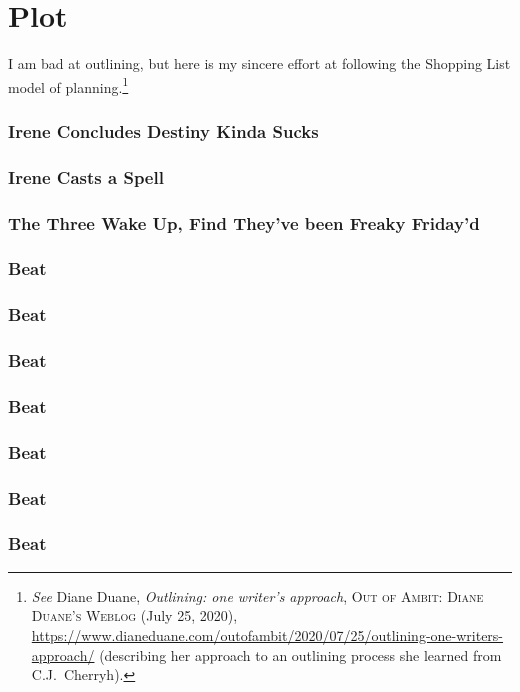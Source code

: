 \documentclass[../FGP.tex]{subfiles}
\begin{document}
\setmarginpargeometry
\part{Plot}
I am bad at outlining, but here is my sincere effort at following the Shopping List model of planning.\footnote{\textit{See} Diane Duane, \textit{Outlining: one writer’s approach}, \textsc{Out of Ambit: Diane Duane's Weblog} (July 25, 2020), \url{https://www.dianeduane.com/outofambit/2020/07/25/outlining-one-writers-approach/} (describing her approach to an outlining process she learned from C.J.~Cherryh).}
\section{Irene Concludes Destiny Kinda Sucks}
\section{Irene Casts a Spell}
\section{The Three Wake Up, Find They've been Freaky Friday'd}
\section{Beat}
\section{Beat}
\section{Beat}
\section{Beat}
\section{Beat}
\section{Beat}
\section{Beat}
\end{document}
